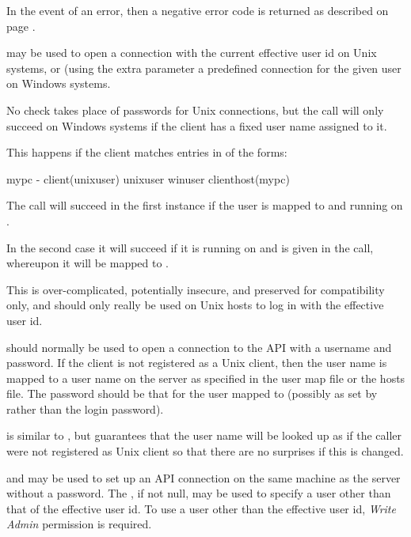 In the event of an error, then a negative error code is returned as described on page \pageref{errorcodes}.

\funcXBopen{} may be used to open a connection with the current effective user id on Unix systems,
or (using the extra  parameter a predefined connection for the given user on Windows systems.

No check takes place of passwords for Unix connections, but the call will only succeed on Windows systems if the client has a fixed user name assigned to it.

This happens if the client matches entries in \hostsfile{} of the forms:

\begin{expara}

mypc  {}-  client(unixuser)
unixuser winuser clienthost(mypc)

\end{expara}

The call will succeed in the first instance if the user is mapped to  and running on .

In the second case it will succeed if it is running on  and  is given in the call,
whereupon it will be mapped to .

This is over-complicated, potentially insecure, and preserved for compatibility only, and \funcXBopen{} should only really be used on Unix hosts to log in with the effective user id.


\funcXBlogin{} should normally be used to open a connection to the API with a username and password.
If the client is not registered as a Unix client, then the user name is mapped to a user name
on the server as specified in the user map file or the hosts file.
The password should be that for the user mapped to (possibly as set by \PrXipasswd{} rather than the login password).

\funcXBwlogin{} is similar to \funcXBlogin{}, but guarantees that the user name will be looked up as if the caller were not registered as Unix client
so that there are no surprises if this is changed.

\funcXBlocallogin{} and \funcXBlocalloginbyid{} may be used to set up an API connection on the same machine as the server without a password.
The , if not null, may be used to specify a user other than that of the effective user id.
To use a user other than the effective user id, \textit{Write Admin}
permission is required.

